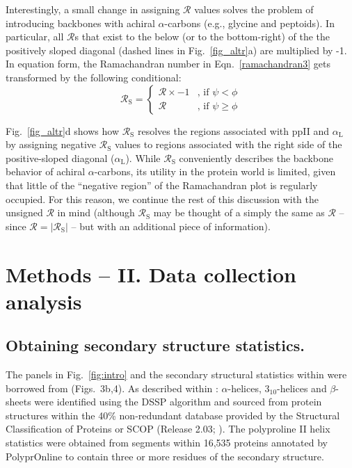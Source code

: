 \documentclass[fleqn,10pt]{wlpeerj} %
\newcommand{\Fig}[1]{Fig.~\ref{#1}}
\newcommand{\Eqn}[1]{Eqn.~\ref{#1}}
\begin{document}
Interestingly, a small change in assigning $\mathcal{R}$ values solves the problem of introducing backbones with achiral $\alpha$-carbons (e.g., glycine and peptoids). In particular, all $\mathcal{R}$s that exist to the below (or to the bottom-right) of the the positively sloped diagonal (dashed lines in \Fig{fig_altr}a) are multiplied by -1. In equation form, the Ramachandran number in \Eqn{ramachandran3} gets transformed by the following conditional:
\begin{equation}
\mathcal{R}_\textrm{S} = 
\begin{cases}
    \mathcal{R}\times-1 &\text{, if } \psi < \phi \\
    \mathcal{R}         &\text{, if } \psi \geq \phi 
\end{cases}\label{eqn:signed}
\end{equation}

\Fig{fig_altr}d shows how $\mathcal{R}_\textrm{S}$ resolves the regions associated with ppII and $\alpha_\textrm{L}$ by assigning negative $\mathcal{R}_\textrm{S}$ values to regions associated with the right side of the positive-sloped diagonal ($\alpha_\textrm{L}$). While $\mathcal{R}_\textrm{S}$ conveniently describes the backbone behavior of achiral $\alpha$-carbons, its utility in the protein world is limited, given that little of the ``negative region'' of the Ramachandran plot is regularly occupied. For this reason, we continue the rest of this discussion with the unsigned $\mathcal{R}$ in mind (although $\mathcal{R}_\textrm{S}$ may be thought of a simply the same as $\mathcal{R}$ -- since $\mathcal{R}=|\mathcal{R}_\textrm{S}|$ -- but with an additional piece of information).

\section*{Methods -- II. Data collection analysis}

\subsection*{Obtaining secondary structure statistics.}
\label{scop}

The panels in \Fig{fig:intro} and the secondary structural statistics within were borrowed from \cite{MannigeKunduWhitelam2016} (Figs.~3b,4). As described within \cite{MannigeKunduWhitelam2016}: $\alpha$-helices, $3_{10}$-helices and $\beta$-sheets were identified using the DSSP algorithm \citep{Zhao2005,Kabsch1983,Joosten2011} and sourced from protein structures within the 40\% non-redundant database provided by the Structural Classification of Proteins or SCOP (Release 2.03; \cite{Fox2014}). The polyproline II helix statistics were obtained from segments within 16,535 proteins annotated by PolyprOnline \citep{Chebrek2014} to contain three or more residues of the secondary structure.
\end{document}

